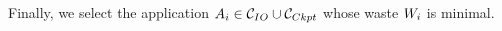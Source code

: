  Finally, we select the application $A_{i} \in \mathcal{C}_{IO} \cup \mathcal{C}_{Ckpt}$ whose waste
 $W_{i}$ is minimal.


%
%
%
%
